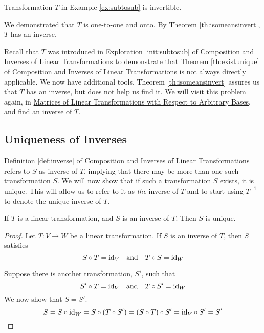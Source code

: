\documentclass{ximera}
\begin{document}
\begin{example}\label{ex:subtosubinvert}
Transformation $T$ in Example \ref{ex:subtosub}  is invertible.
\begin{explanation}
We demonstrated that $T$ is one-to-one and onto.  By Theorem \ref{th:isomeansinvert}, $T$ has an inverse.  

Recall that $T$ was introduced in Exploration \ref {init:subtosub} of \href{https://ximera.osu.edu/linearalgebradzv3/LinearAlgebraInteractiveIntro/LTR-0030/main}{Composition and Inverses of Linear Transformations} to demonstrate that Theorem \ref{th:existunique} of \href{https://ximera.osu.edu/linearalgebradzv3/LinearAlgebraInteractiveIntro/LTR-0030/main}{Composition and Inverses of Linear Transformations} is not always directly applicable.  We now have additional tools. Theorem \ref{th:isomeansinvert} assures us that $T$ has an inverse, but does not help us find it. We will visit this problem again, in \href{https://ximera.osu.edu/linearalgebradzv3/LinearAlgebraInteractiveIntro/LTR-0080/main}{Matrices of Linear Transformations with Respect to Arbitrary Bases}, and find an inverse of $T$.
\end{explanation}
\end{example}

\subsection*{Uniqueness of Inverses}

Definition \ref{def:inverse} of \href{https://ximera.osu.edu/linearalgebradzv3/LinearAlgebraInteractiveIntro/LTR-0030/main}{Composition and Inverses of Linear Transformations} refers to $S$ as  inverse of $T$, implying that there may be more than one such transformation $S$.  We will now show that if such a transformation $S$ exists, it is unique.  This will allow us to refer to it as {\it the} inverse of $T$ and to start using $T^{-1}$ to denote the unique inverse of $T$.

\begin{theorem}\label{th:inverseisunique}
If $T$ is a linear transformation, and $S$ is an inverse of $T$.  Then $S$ is unique.
\end{theorem}
\begin{proof}
Let $T:V\rightarrow W$ be a linear transformation.  If $S$ is an inverse of $T$, then $S$ satisfies
$$S\circ T=\text{id}_V\quad \text{and}\quad T\circ S=\text{id}_W$$

Suppose there is another transformation, $S'$, such that 
$$S'\circ T=\text{id}_V\quad \text{and}\quad T\circ S'=\text{id}_W$$
We now show that $S=S'$.
$$S=S\circ \text{id}_W=S\circ(T\circ S')=(S\circ T)\circ S'=\text{id}_V\circ S'=S'$$
\end{proof}
\end{document}
